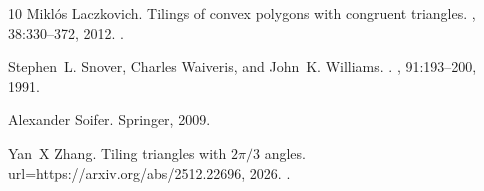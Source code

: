 \documentclass{amsart}
\theoremstyle{plain}
\theoremstyle{definition}
\theoremstyle{remark}
\begin{document}
\begin{thebibliography}{10}
Mikl{\'o}s Laczkovich.
\newblock Tilings of convex polygons with congruent triangles.
, 38:330--372, 2012.
\newblock \href {https://doi.org/10.1007/s00454-012-9404-x}
  {}.

Stephen~L. Snover, Charles Waiveris, and John~K. Williams.
.
, 91:193--200, 1991.

Alexander Soifer.
\newblock Springer, 2009.

Yan~X Zhang.
\newblock Tiling triangles with $2\pi/3$ angles.
\newblock url={https://arxiv.org/abs/2512.22696}, 2026.
\newblock \href {https://arxiv.org/abs/2512.22696} {}.

\end{thebibliography}
\end{document}
